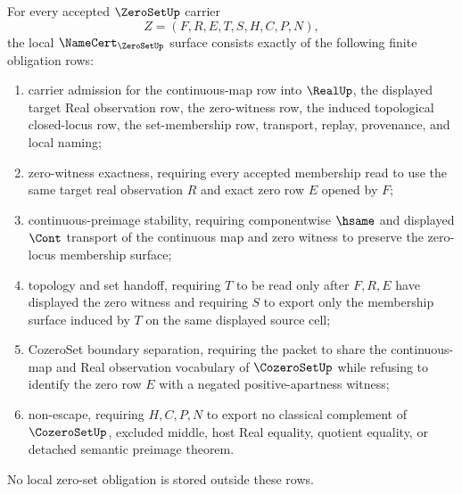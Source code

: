\begin{theorem}
\label{thm:zero-set-namecert-obligations}
For every accepted $\ZeroSetUp$ carrier
$$
Z=(F,R,E,T,S,H,C,P,N),
$$
the local $\NameCert_{\ZeroSetUp}$ surface consists exactly of the following finite obligation rows:
\begin{enumerate}
\item carrier admission for the continuous-map row into $\RealUp$, the displayed target Real observation row, the zero-witness row, the induced topological closed-locus row, the set-membership row, transport, replay, provenance, and local naming;
\item zero-witness exactness, requiring every accepted membership read to use the same target real observation $R$ and exact zero row $E$ opened by $F$;
\item continuous-preimage stability, requiring componentwise $\hsame$ and displayed $\Cont$ transport of the continuous map and zero witness to preserve the zero-locus membership surface;
\item topology and set handoff, requiring $T$ to be read only after $F,R,E$ have displayed the zero witness and requiring $S$ to export only the membership surface induced by $T$ on the same displayed source cell;
\item CozeroSet boundary separation, requiring the packet to share the continuous-map and Real observation vocabulary of $\CozeroSetUp$ while refusing to identify the zero row $E$ with a negated positive-apartness witness;
\item non-escape, requiring $H,C,P,N$ to export no classical complement of $\CozeroSetUp$, excluded middle, host Real equality, quotient equality, or detached semantic preimage theorem.
\end{enumerate}
No local zero-set obligation is stored outside these rows.
\end{theorem}
